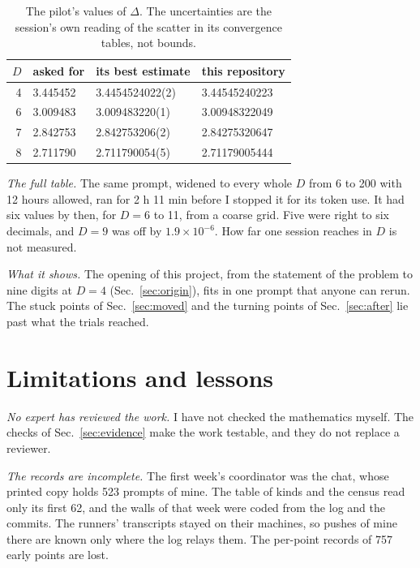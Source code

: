 \documentclass[aps,prd,onecolumn,superscriptaddress,nofootinbib,10pt]{revtex4-2}
\begin{document}
\begin{table}[h]
\caption{The pilot's values of $\Delta$. The uncertainties are the session's own reading of the scatter in its
convergence tables, not bounds.}
\label{tab:single}
\small
\begin{tabular}{rL{2.6cm}L{3.6cm}L{3.4cm}}
\toprule
$D$ & asked for & its best estimate & this repository\\
 & 3.445452 & 3.4454524022(2) & 3.44545240223\\
6 & 3.009483 & 3.009483220(1) & 3.00948322049\\
7 & 2.842753 & 2.842753206(2) & 2.84275320647\\
8 & 2.711790 & 2.711790054(5) & 2.71179005444\\
\bottomrule
\end{tabular}
\end{table}

\emph{The full table.} The same prompt, widened to every whole $D$ from 6 to 200 with 12 hours allowed, ran for 2 h 11
min before I stopped it for its token use. It had six values by then, for $D = 6$ to 11, from a coarse grid. Five were
right to six decimals, and $D = 9$ was off by $1.9\times10^{-6}$. How far one session reaches in $D$ is not measured.

\emph{What it shows.} The opening of this project, from the statement of the problem to nine digits at $D = 4$
(Sec.~\ref{sec:origin}), fits in one prompt that anyone can rerun. The stuck points of Sec.~\ref{sec:moved} and the
turning points of Sec.~\ref{sec:after} lie past what the trials reached.

\section{Limitations and lessons}
\label{sec:limits}

\emph{No expert has reviewed the work.} I have not checked the mathematics myself. The checks of Sec.~\ref{sec:evidence}
make the work testable, and they do not replace a reviewer.

\emph{The records are incomplete.} The first week's coordinator was the chat, whose printed copy holds 523 prompts of
mine. The table of kinds and the census read only its first 62, and the walls of that week were coded from the log and
the commits. The runners' transcripts stayed on their machines, so pushes of mine there are known only where the log
relays them. The per-point records of 757 early points are lost.
\end{document}
